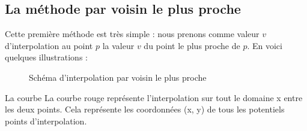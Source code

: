
\subsection{La méthode par voisin le plus proche}
Cette première méthode est très simple : nous prenons comme valeur \( v \) d'interpolation au point \( p \) la valeur \( v \) du point le plus proche de \( p \).
En voici quelques illustrations :


\begin{figure}[ht!]
    \centering
    \caption{Schéma d'interpolation par voisin le plus proche}
    \label{fig:interpolation_voisin}
\end{figure}

La courbe La courbe rouge représente l'interpolation sur tout le domaine x entre les deux points. Cela représente les coordonnées (x, y) de tous les potentiels points d'interpolation.

